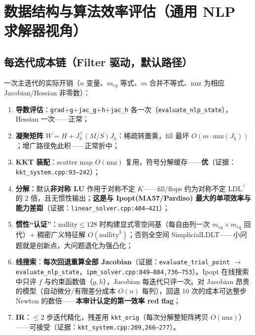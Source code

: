 \documentclass[11pt,a4paper]{ctexart}
\newcommand{\file}[1]{\texttt{#1}}
\newcommand{\func}[1]{\texttt{#1}}
\newcommand{\opt}[1]{\texttt{#1}}
\newcommand{\evid}[1]{{\footnotesize\color{black!70}（证据：#1）}}
\begin{document}
\section{数据结构与算法效率评估（通用 NLP 求解器视角）}\label{sec:eff}

\subsection{每迭代成本链（Filter 驱动，默认路径）}
一次主迭代的实际开销（$n$ 变量、$m_{eq}$ 等式、$m$ 合并不等式、$\mathrm{nnz}$ 为相应 Jacobian/Hessian 非零数）：
\begin{enumerate}[leftmargin=2em]
  \item \textbf{导数评估}：\opt{grad}+\opt{g}+\opt{jac\_g}+\opt{h}+\opt{jac\_h} 各一次（\func{evaluate\_nlp\_state}），Hessian 一次——正常；
  \item \textbf{凝聚矩阵} $W = H + J_h^{\top}(M/S)J_h$：稀疏转置乘，fill 最坏 $O(m\cdot \mathrm{nnz}(J_h))$；增广路径免此积——正常折中；
  \item \textbf{KKT 装配}：scatter map $O(\mathrm{nnz})$ 复用，符号分解缓存——\textbf{优}\evid{\file{kkt\_system.cpp:93--242}}；
  \item \textbf{分解}：默认\textbf{非对称 LU} 作用于对称不定 $K$——fill/flops 约为对称不定 LDL$^{\top}$ 的 2 倍，且无惯性输出；\textbf{这是与 Ipopt(MA57/Pardiso) 最大的单项效率与能力差距}\evid{\file{linear\_solver.cpp:404--421}}；
  \item \textbf{惯性``认证''}：nullity$\le 128$ 时构建显式零空间基（每自由列一次 $m_{eq}\times m_{eq}$ 回代）+ 稠密广义特征解 $O(\mathrm{nullity}^3)$；否则全空间 SimplicialLDLT——小问题就是创新点，大问题退化为强凸化；
  \item \textbf{线搜索}：\textbf{每次回退重算全部 Jacobian}\evid{\func{evaluate\_trial\_point} $\to$ \func{evaluate\_nlp\_state}，\file{ipm\_solver.cpp:849--884,736--753}}。Ipopt 在线搜索中只评 $f$ 与约束函数值（$g,h$），Jacobian 每迭代只评一次。对 Jacobian 昂贵的模型（自动微分/有限差分成本 $O(n)$ 每列），回退 10 次的成本可达整步 Newton 的数倍——\textbf{本审计认定的第一效率 red flag}；
  \item \textbf{IR}：$\le 2$ 步迭代精化，残差用 \opt{kkt\_orig}（每次分解整矩阵拷贝 $O(\mathrm{nnz})$）——可接受\evid{\file{kkt\_system.cpp:209,266--277}}。
\end{enumerate}
\end{document}
